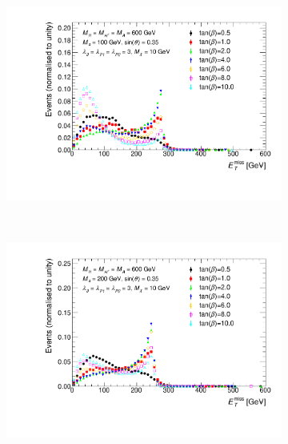 \begin{figure}[tbp]
\centering
\begin{subfigure}{0.48\textwidth}
\includegraphics[width = \textwidth]{texinputs/04_grid/figures/monoHbb_tanb_scan_MA600_Ma100_MET_liny_norm2one.pdf}
\end{subfigure}
~
\begin{subfigure}{0.48\textwidth}
\includegraphics[width = \textwidth]{texinputs/04_grid/figures/monoHbb_tanb_scan_MA600_Ma200_MET_liny_norm2one.pdf}
\end{subfigure}
\\
\centering
\begin{subfigure}{0.48\textwidth}

\end{subfigure}
\end{figure}
